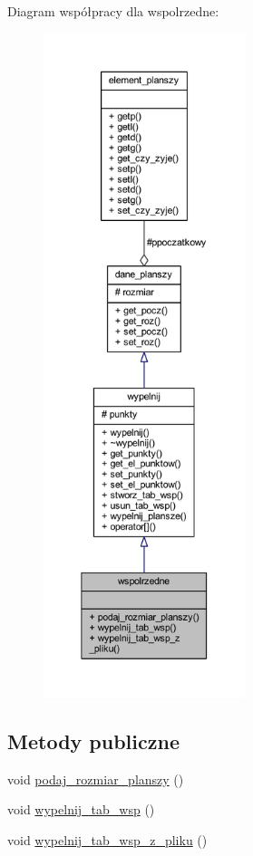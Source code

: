 Diagram współpracy dla wspolrzedne\+:
\nopagebreak
\begin{figure}[H]
\begin{center}
\leavevmode
\includegraphics[height=550pt]{classwspolrzedne__coll__graph}
\end{center}
\end{figure}
\subsection*{Metody publiczne}
\begin{DoxyCompactItemize}
\item 
void \mbox{\hyperlink{classwspolrzedne_a38c1a6012fac2575a2446ab094186114}{podaj\+\_\+rozmiar\+\_\+planszy}} ()
\item 
void \mbox{\hyperlink{classwspolrzedne_a9995d04ed35891918459a091284fa76f}{wypelnij\+\_\+tab\+\_\+wsp}} ()
\item 
void \mbox{\hyperlink{classwspolrzedne_a9fcebd535a4a970e7007be5b13791fbf}{wypelnij\+\_\+tab\+\_\+wsp\+\_\+z\+\_\+pliku}} ()
\end{DoxyCompactItemize}
